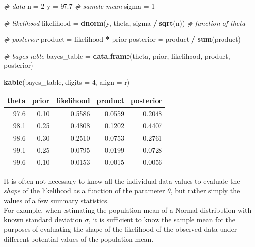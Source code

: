\documentclass[
]{book}
\newenvironment{Shaded}{\begin{snugshade}}{\end{snugshade}}
\newcommand{\CommentTok}[1]{\textcolor[rgb]{0.56,0.35,0.01}{\textit{#1}}}
\newcommand{\DataTypeTok}[1]{\textcolor[rgb]{0.13,0.29,0.53}{#1}}
\newcommand{\DecValTok}[1]{\textcolor[rgb]{0.00,0.00,0.81}{#1}}
\newcommand{\FloatTok}[1]{\textcolor[rgb]{0.00,0.00,0.81}{#1}}
\newcommand{\KeywordTok}[1]{\textcolor[rgb]{0.13,0.29,0.53}{\textbf{#1}}}
\newcommand{\NormalTok}[1]{#1}
\newcommand{\OperatorTok}[1]{\textcolor[rgb]{0.81,0.36,0.00}{\textbf{#1}}}
\newcommand{\StringTok}[1]{\textcolor[rgb]{0.31,0.60,0.02}{#1}}
\theoremstyle{definition}
\theoremstyle{definition}
\theoremstyle{definition}
\theoremstyle{remark}
\begin{document}
\begin{enumerate}
\begin{Shaded}
\begin{Highlighting}[]
\CommentTok{\# data}
\NormalTok{n =}\StringTok{ }\DecValTok{2}
\NormalTok{y =}\StringTok{ }\FloatTok{97.7} \CommentTok{\# sample mean}
\NormalTok{sigma =}\StringTok{ }\DecValTok{1}


\CommentTok{\# likelihood}
\NormalTok{likelihood =}\StringTok{ }\KeywordTok{dnorm}\NormalTok{(y, theta, sigma }\OperatorTok{/}\StringTok{ }\KeywordTok{sqrt}\NormalTok{(n)) }\CommentTok{\# function of theta}

\CommentTok{\# posterior}
\NormalTok{product =}\StringTok{ }\NormalTok{likelihood }\OperatorTok{*}\StringTok{ }\NormalTok{prior}
\NormalTok{posterior =}\StringTok{ }\NormalTok{product }\OperatorTok{/}\StringTok{ }\KeywordTok{sum}\NormalTok{(product)}

\CommentTok{\# bayes table}
\NormalTok{bayes\_table =}\StringTok{ }\KeywordTok{data.frame}\NormalTok{(theta,}
\NormalTok{                     prior,}
\NormalTok{                     likelihood,}
\NormalTok{                     product,}
\NormalTok{                     posterior)}

\KeywordTok{kable}\NormalTok{(bayes\_table, }\DataTypeTok{digits =} \DecValTok{4}\NormalTok{, }\DataTypeTok{align =} \StringTok{\textquotesingle{}r\textquotesingle{}}\NormalTok{)}
\end{Highlighting}
\end{Shaded}

  \begin{tabular}{r|r|r|r|r}
   \hline
   theta & prior & likelihood & product & posterior\\
   \hline
   97.6 & 0.10 & 0.5586 & 0.0559 & 0.2048\\
   \hline
   98.1 & 0.25 & 0.4808 & 0.1202 & 0.4407\\
   \hline
   98.6 & 0.30 & 0.2510 & 0.0753 & 0.2761\\
   \hline
   99.1 & 0.25 & 0.0795 & 0.0199 & 0.0728\\
   \hline
   99.6 & 0.10 & 0.0153 & 0.0015 & 0.0056\\
   \hline
   \end{tabular}
\end{enumerate}

It is often not necessary to know all the individual data values to evaluate the \emph{shape} of the likelihood as a function of the parameter \(\theta\), but rather simply the values of a few summary statistics.\\
For example, when estimating the population mean of a Normal distribution with known standard deviation \(\sigma\), it is sufficient to know the sample mean for the purposes of evaluating the shape of the likelihood of the observed data under different potential values of the population mean.
\end{document}
